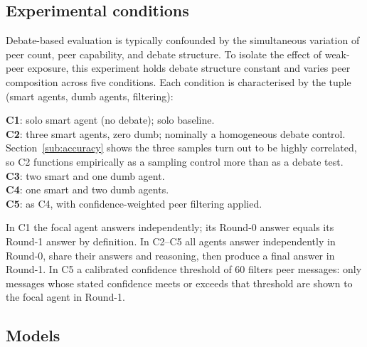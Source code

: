 \documentclass[review,3p,authoryear]{elsarticle}
\begin{document}
\subsection{Experimental conditions}
\label{sub:conditions}

Debate-based evaluation is typically confounded by the simultaneous
variation of peer count, peer capability, and debate structure.
To isolate the effect of weak-peer exposure, this experiment holds debate
structure constant and varies peer composition across five conditions.
Each condition is characterised by the tuple (smart agents, dumb agents,
filtering):

\medskip
\noindent
\textbf{C1}: solo smart agent (no debate); solo baseline. \\
\textbf{C2}: three smart agents, zero dumb; nominally a homogeneous
debate control. Section~\ref{sub:accuracy} shows the three samples
turn out to be highly correlated, so C2 functions empirically as a
sampling control more than as a debate test. \\
\textbf{C3}: two smart and one dumb agent. \\
\textbf{C4}: one smart and two dumb agents. \\
\textbf{C5}: as C4, with confidence-weighted peer filtering applied.
\medskip

In C1 the focal agent answers independently; its Round-0 answer equals
its Round-1 answer by definition.
In C2--C5 all agents answer independently in Round-0, share their answers
and reasoning, then produce a final answer in Round-1.
In C5 a calibrated confidence threshold of 60 filters peer messages:
only messages whose stated confidence meets or exceeds that threshold
are shown to the focal agent in Round-1.

\subsection{Models}
\label{sub:models}
\end{document}
